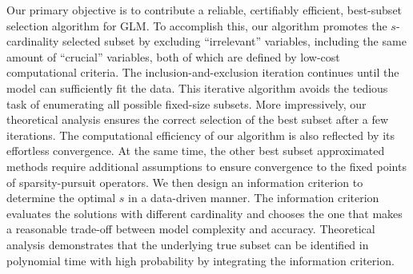 Our primary objective is to contribute a reliable, certifiably efficient, best-subset selection algorithm for GLM. To accomplish this, our algorithm promotes the $s$-cardinality selected subset by excluding ``irrelevant'' variables, including the same amount of ``crucial'' variables, both of which are defined by low-cost computational criteria. The inclusion-and-exclusion iteration continues until the model can sufficiently fit the data. This iterative algorithm avoids the tedious task of enumerating all possible fixed-size subsets. More impressively, our theoretical analysis ensures the correct selection of the best subset after a few iterations. The computational efficiency of our algorithm is also reflected by its effortless convergence. At the same time, the other best subset approximated methods require additional assumptions to ensure convergence to the fixed points of sparsity-pursuit operators. We then design an information criterion to determine the optimal $s$ in a data-driven manner. The information criterion evaluates the solutions with different cardinality and chooses the one that makes a reasonable trade-off between model complexity and accuracy. Theoretical analysis demonstrates that the underlying true subset can be identified in polynomial time with high probability by integrating the information criterion.


